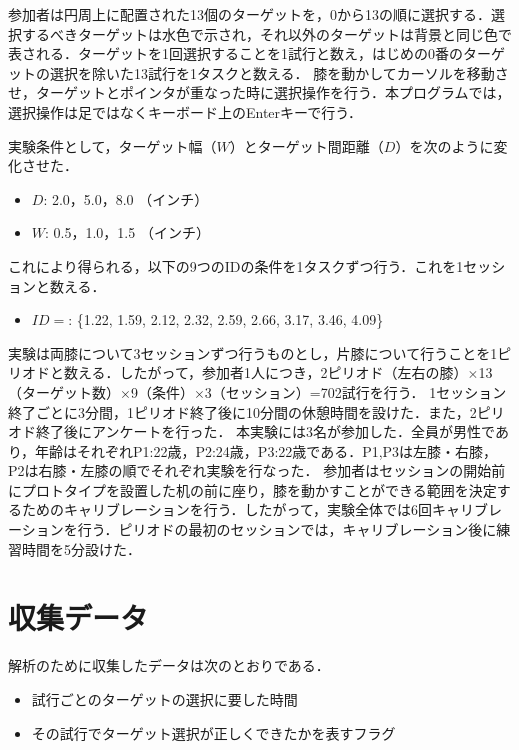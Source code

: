 参加者は円周上に配置された13個のターゲットを，0から13の順に選択する．選択するべきターゲットは水色で示され，それ以外のターゲットは背景と同じ色で表される．ターゲットを1回選択することを1試行と数え，はじめの0番のターゲットの選択を除いた13試行を1タスクと数える．
膝を動かしてカーソルを移動させ，ターゲットとポインタが重なった時に選択操作を行う．本プログラムでは，選択操作は足ではなくキーボード上のEnterキーで行う．

実験条件として，ターゲット幅（$W$）とターゲット間距離（$D$）を次のように変化させた．

\begin{itemize}
	\item $D$: 2.0，5.0，8.0 （インチ）
	\item $W$: 0.5，1.0，1.5 （インチ）
\end{itemize}
これにより得られる，以下の9つのIDの条件を1タスクずつ行う．これを1セッションと数える．
\begin{itemize}
	\item $ID = $: \{1.22, 1.59, 2.12, 2.32, 2.59, 2.66, 3.17,  3.46, 4.09\}
\end{itemize}
実験は両膝について3セッションずつ行うものとし，片膝について行うことを1ピリオドと数える．したがって，参加者1人につき，2ピリオド（左右の膝）$\times$13（ターゲット数）$\times$9（条件）$\times$3（セッション）=702試行を行う．
1セッション終了ごとに3分間，1ピリオド終了後に10分間の休憩時間を設けた．また，2ピリオド終了後にアンケートを行った．
本実験には3名が参加した．全員が男性であり，年齢はそれぞれP1:22歳，P2:24歳，P3:22歳である．P1,P3は左膝・右膝，P2は右膝・左膝の順でそれぞれ実験を行なった．
参加者はセッションの開始前にプロトタイプを設置した机の前に座り，膝を動かすことができる範囲を決定するためのキャリブレーションを行う．したがって，実験全体では6回キャリブレーションを行う．ピリオドの最初のセッションでは，キャリブレーション後に練習時間を5分設けた．

\section{収集データ}
解析のために収集したデータは次のとおりである．
\begin{itemize}
	\item 試行ごとのターゲットの選択に要した時間
	\item その試行でターゲット選択が正しくできたかを表すフラグ
\end{itemize}


